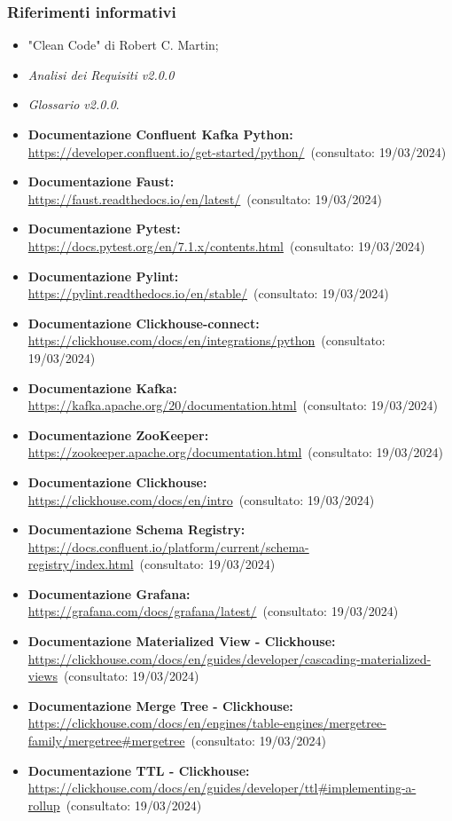 \subsubsection{Riferimenti informativi}
\begin{itemize}
    \item "Clean Code" di Robert C. Martin;
    \item \textit{Analisi dei Requisiti v2.0.0}
    \item \textit{Glossario v2.0.0}.
    \item \textbf{Documentazione Confluent Kafka Python:} \url{https://developer.confluent.io/get-started/python/}~(consultato: 19/03/2024)
    \item \textbf{Documentazione Faust:} \url{https://faust.readthedocs.io/en/latest/}~(consultato: 19/03/2024)
    \item \textbf{Documentazione Pytest:} \url{https://docs.pytest.org/en/7.1.x/contents.html}~(consultato: 19/03/2024)
    \item \textbf{Documentazione Pylint:} \url{https://pylint.readthedocs.io/en/stable/}~(consultato: 19/03/2024)
    \item \textbf{Documentazione Clickhouse-connect:} \url{https://clickhouse.com/docs/en/integrations/python}~(consultato: 19/03/2024)
    \item \textbf{Documentazione Kafka:} \url{https://kafka.apache.org/20/documentation.html}~(consultato: 19/03/2024)
    \item \textbf{Documentazione ZooKeeper:} \url{https://zookeeper.apache.org/documentation.html}~(consultato: 19/03/2024)
    \item \textbf{Documentazione Clickhouse:} \url{https://clickhouse.com/docs/en/intro}~(consultato: 19/03/2024)
    \item \textbf{Documentazione Schema Registry:} \url{https://docs.confluent.io/platform/current/schema-registry/index.html}~(consultato: 19/03/2024)
    \item \textbf{Documentazione Grafana:} \url{https://grafana.com/docs/grafana/latest/}~(consultato: 19/03/2024)
    \item \textbf{Documentazione Materialized View - Clickhouse:} \url{https://clickhouse.com/docs/en/guides/developer/cascading-materialized-views}~(consultato: 19/03/2024)
    \item \textbf{Documentazione Merge Tree - Clickhouse:} \url{https://clickhouse.com/docs/en/engines/table-engines/mergetree-family/mergetree#mergetree}~(consultato: 19/03/2024)
    \item \textbf{Documentazione TTL - Clickhouse:} \url{https://clickhouse.com/docs/en/guides/developer/ttl#implementing-a-rollup}~(consultato: 19/03/2024)

\end{itemize}
